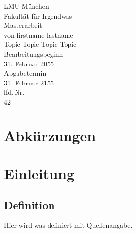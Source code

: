 \documentclass[
parskip=true,  %
fontsize=12pt, %
BCOR=12mm,     %
twoside=false  %
]{scrreprt}
\begin{document}
%  

\begin{titlepage}
  \begin{center}
    \Large
    LMU München\\
    \large
    Fakultät für Irgendwas\\
    \vspace{15mm}
    \LARGE
    Masterarbeit\\
    \large
    von firstname lastname\\
    \vspace{15mm}
    \LARGE
    Topic Topic Topic Topic\\
    \vspace{15mm}
    \large
    Bearbeitungsbeginn\\
    \Large
    31. Februar 2055\\
    \vspace{5mm}
    \large
    Abgabetermin\\
    \Large
    31. Februar 2155\\
    \vspace{15mm}
    \large
    lfd.\,Nr.\\
    \Large
    42
  \end{center}
\end{titlepage}


\tableofcontents
\listoffigures
\listoftables

\chapter*{Abkürzungen}

\begin{acronym}
\end{acronym}


\chapter{Einleitung}

\section{Definition}

Hier wird was definiert mit Quellenangabe\cite{wiki:muenchen}.
\end{document}
